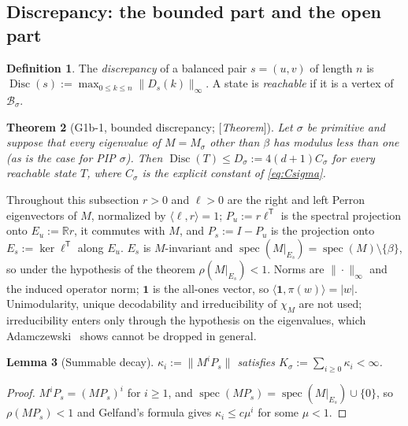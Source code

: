 \documentclass[11pt]{amsart}
\theoremstyle{plain}
\newtheorem{theorem}{Theorem}[section]
\newtheorem{lemma}[theorem]{Lemma}
\theoremstyle{definition}
\newtheorem{definition}[theorem]{Definition}
\theoremstyle{remark}
\newcommand{\R}{\mathbb{R}}
\newcommand{\B}{\mathcal{B}}
\newcommand{\Disc}{\operatorname{Disc}}
\newcommand{\spec}{\operatorname{spec}}
\newcommand{\Status}[1]{\textup{[\textit{#1}]}}
\begin{document}
\subsection{Discrepancy: the bounded part and the open part}\label{sec:disc}

\begin{definition}\label{def:disc}
The \emph{discrepancy} of a balanced pair $s=(u,v)$ of length $n$ is $\Disc(s):=\max_{0\le k\le n}\|D_s(k)\|_\infty$. A state is \emph{reachable} if it is a vertex of $\B_\sigma$.
\end{definition}

\begin{theorem}[G1b-1, bounded discrepancy; \Status{Theorem}]\label{thm:G1b1}
Let $\sigma$ be primitive and suppose that every eigenvalue of $M=M_\sigma$ other than $\beta$ has modulus less than one (as is the case for PIP $\sigma$). Then $\Disc(T)\le D_\sigma:=4(d+1)C_\sigma$ for every reachable state $T$, where $C_\sigma$ is the explicit constant of \eqref{eq:Csigma}.
\end{theorem}

Throughout this subsection $r>0$ and $\ell>0$ are the right and left Perron eigenvectors of $M$, normalized by $\langle\ell,r\rangle=1$; $P_u:=r\ell^{\mathsf T}$ is the spectral projection onto $E_u:=\R r$, it commutes with $M$, and $P_s:=I-P_u$ is the projection onto $E_s:=\ker\ell^{\mathsf T}$ along $E_u$. $E_s$ is $M$-invariant and $\spec(M|_{E_s})=\spec(M)\setminus\{\beta\}$, so under the hypothesis of the theorem $\rho(M|_{E_s})<1$. Norms are $\|\cdot\|_\infty$ and the induced operator norm; $\mathbf 1$ is the all-ones vector, so $\langle\mathbf 1,\pi(w)\rangle=|w|$. Unimodularity, unique decodability and irreducibility of $\chi_M$ are not used; irreducibility enters only through the hypothesis on the eigenvalues, which Adamczewski~\cite{Adam} shows cannot be dropped in general.

\begin{lemma}[Summable decay]\label{lem:decay}
$\kappa_i:=\|M^iP_s\|$ satisfies $K_\sigma:=\sum_{i\ge0}\kappa_i<\infty$.
\end{lemma}
\begin{proof}
$M^iP_s=(MP_s)^i$ for $i\ge1$, and $\spec(MP_s)=\spec(M|_{E_s})\cup\{0\}$, so $\rho(MP_s)<1$ and Gelfand's formula gives $\kappa_i\le c\mu^i$ for some $\mu<1$.
\end{proof}
\end{document}
